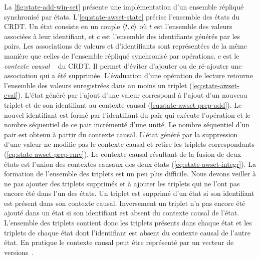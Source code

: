 La \autoref{fig:state-add-win-set} présente une implémentation d'un ensemble répliqué synchronisé par états.
L'\autoref{eq:state-awset-state} précise l'ensemble des états du \ac{CRDT}.
Un état consiste en un couple $\tuple*{t,c}$ où $t$ est l'ensemble des valeurs associées à leur identifiant, et $c$ est l'ensemble des identifiants générés par les pairs.
Les associations de valeurs et d'identifiants sont représentées de la même manière que celles de l'ensemble répliqué synchronisé par opérations.
$c$ est le \emph{contexte causal }~\autocite{almeida_2018_delta-crdt-revisited} du \ac{CRDT}.
Il permet d'éviter d'ajouter ou de ré-ajouter une association qui a été supprimée.
L'évaluation d'une opération de lecture retourne l'ensemble des valeurs enregistrées dans au moins un triplet (\autoref{eq:state-awset-eval}).
L'état généré par l'ajout d'une valeur correspond à l'ajout d'un nouveau triplet et de son identifiant au contexte causal (\autoref{eq:state-awset-prep-add}).
Le nouvel identifiant est formé par l'identifiant du pair qui exécute l'opération et le nombre séquentiel de ce pair incrémenté d'une unité.
Le nombre séquentiel d'un pair est obtenu à partir du contexte causal.
L'état généré par la suppression d'une valeur ne modifie pas le contexte causal et retire les triplets correspondants (\autoref{eq:state-awset-prep-rmv}).
Le contexte causal résultant de la fusion de deux états est l'union des contextes causaux des deux états (\autoref{eq:state-awset-integr}).
La formation de l'ensemble des triplets est un peu plus difficile.
Nous devons veiller à ne pas ajouter des triplets supprimés et à ajouter les triplets qui ne l'ont pas encore été dans l'un des états.
Un triplet est supprimé d'un état si son identifiant est présent dans son contexte causal.
Inversement un triplet n'a pas encore été ajouté dans un état si son identifiant est absent du contexte causal de l'état.
L'ensemble des triplets contient donc les triplets présents dans chaque état et les triplets de chaque état dont l'identifiant est absent du contexte causal de l'autre état.
En pratique le contexte causal peut être représenté par un vecteur de versions~\autocite{parker_1983_versionvector,mattern_1988_timevector}.

